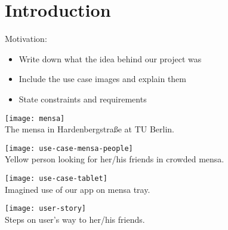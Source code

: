 \chapter{Introduction}
\label{cha:introduction}

Motivation:
\begin{itemize}
    \item Write down what the idea behind our project was
    \item Include the use case images and explain them
    \item State constraints and requirements
\end{itemize}

\hline


\begin{center}
    \texttt{[image: mensa]}\\
    The mensa in Hardenbergstraße at TU Berlin.
\end{center}

\begin{center}
    \texttt{[image: use-case-mensa-people]}\\
    Yellow person looking for her/his friends in crowded mensa.
\end{center}

\begin{center}
    \texttt{[image: use-case-tablet]}\\
    Imagined use of our app on mensa tray.
\end{center}

\begin{center}
    \texttt{[image: user-story]}\\
    Steps on user's way to her/his friends.
\end{center}